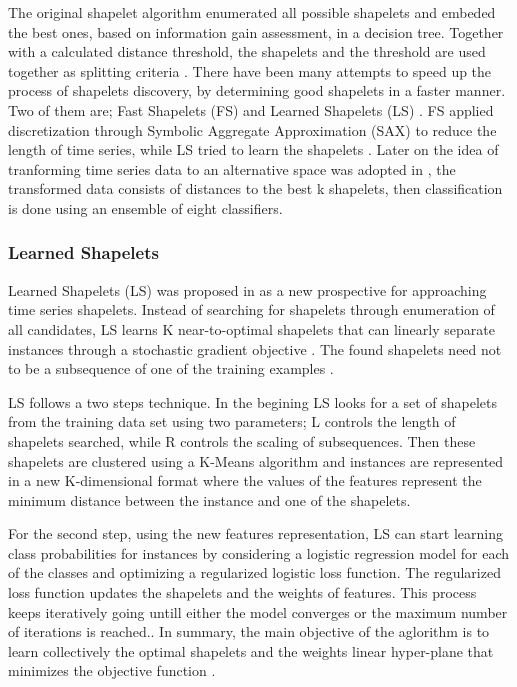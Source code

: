 The original shapelet algorithm enumerated all possible shapelets and embeded the best ones, based on information gain assessment, in a decision tree.
Together with a calculated distance threshold, the shapelets and the threshold are used together as splitting criteria \cite{lines2018time,schafer2015boss}.
There have been many attempts to speed up the process of shapelets discovery, by determining good shapelets in a faster manner.
Two of them are; Fast Shapelets (FS) \cite{rakthanmanon2013fast} and Learned Shapelets (LS) \cite{grabocka2014learning}.
FS applied discretization through Symbolic Aggregate Approximation (SAX) to reduce the length of time series,
while LS tried to learn the shapelets \cite{shifaz2020ts}.
Later on the idea of tranforming time series data to an alternative space was adopted in \cite{hills2014classification},
the transformed data consists of distances to the best k shapelets, then classification is done using an ensemble of eight classifiers.

\subsubsection{Learned Shapelets}
\label{SubsubsectionLS}
Learned Shapelets (LS) was proposed in \cite{grabocka2014learning} as a new prospective for approaching time series shapelets.
Instead of searching for shapelets through enumeration of all candidates, LS learns K near-to-optimal shapelets that can linearly
separate instances through a stochastic gradient objective \cite{lines2018time,bostrom2018shapelet}.
The found shapelets need not to be a subsequence of one of the training examples \cite{bagnall2017great,schafer2017fast}.

LS follows a two steps technique. In the begining LS looks for a set of shapelets from the training data set using two parameters;
L controls the length of shapelets searched, while R controls the scaling of subsequences. Then these shapelets are clustered using
a K-Means algorithm and instances are represented in a new K-dimensional format where the values of the features represent the minimum
distance between the instance and one of the shapelets.

For the second step, using the new features representation, LS can start learning class probabilities for instances by considering a logistic regression model for each
of the classes and optimizing a regularized logistic loss function. The regularized loss function updates the shapelets and the weights of features.
This process keeps iteratively going untill either the model converges or the maximum number of iterations is reached.\cite{bostrom2018shapelet}.
In summary, the main objective of the aglorithm is to learn collectively the optimal shapelets and the weights
linear hyper-plane that minimizes the objective function \cite{bagnall2017great,grabocka2014learning}.

